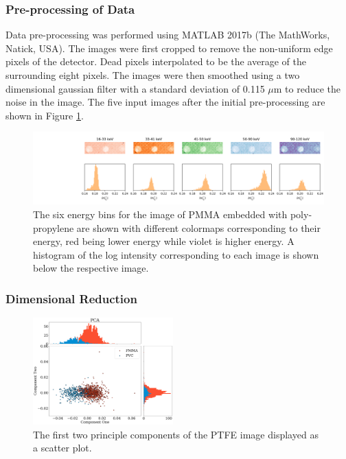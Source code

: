 \documentclass[a4paper,11pt]{article}
\begin{document}
\subsubsection{Pre-processing of Data}

Data pre-processing was performed using MATLAB 2017b (The MathWorks, Natick, USA). The images were first cropped to remove the non-uniform edge pixels of the detector. Dead pixels interpolated to be the average of the surrounding eight pixels. The images were then smoothed using a two dimensional gaussian filter with a standard deviation of 0.115 $\mu$m to reduce the noise in the image. The five input images after the initial pre-processing are shown in Figure \ref{demonstrating_bins}.

\begin{figure}[htbp]

\includegraphics[width=\textwidth]{figures/poly_figure2.png}

\caption{The six energy bins for the image of PMMA embedded with poly-propylene are shown with different colormaps corresponding to their energy, red being lower energy while violet is higher energy. A histogram of the log intensity corresponding to each image is shown below the respective image.}
\label{demonstrating_bins}
\end{figure}

\subsubsection{Dimensional Reduction}

\begin{figure}
  
  \begin{center}
    \includegraphics[width=0.48\textwidth]{figures/PCAnone.png}
  \end{center}
  
  \caption{The first two principle components of the PTFE image displayed as a scatter plot.}
  \label{PCA}
  
\end{figure}
\end{document}
